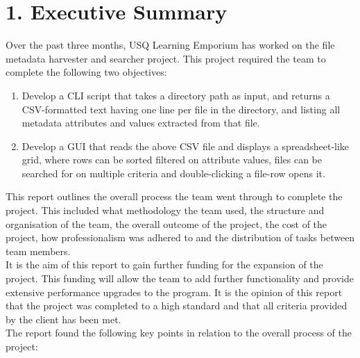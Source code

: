 \documentclass[11pt]{article}
\begin{document}
\newpage





\tableofcontents
\newpage






\setcounter{secnumdepth}{0}

\section{1. Executive Summary}
Over the past three months, USQ Learning Emporium has worked on the file metadata harvester and searcher project. This project required the team to complete the following two objectives:

\begin{enumerate}
\item Develop a CLI script that takes a directory path as input, and returns a CSV-formatted text having one line per file in the directory, and listing all metadata attributes and values extracted from that file.
\item Develop a GUI that reads the above CSV file and displays a spreadsheet-like grid, where rows can be sorted filtered on attribute values, files can be searched for on multiple criteria and double-clicking a file-row opens it.
\end{enumerate}

This report outlines the overall process the team went through to complete the project. This included what methodology the team used, the structure and organisation of the team, the overall outcome of the project, the cost of the project, how professionalism was adhered to and the distribution of tasks between team members. \\

It is the aim of this report to gain further funding for the expansion of the project. This funding will allow the team to add further functionality and provide extensive performance upgrades to the program. It is the opinion of this report that the project was completed to a high standard and that all criteria provided by the client has been met. \\

The report found the following key points in relation to the overall process of the project: 
\end{document}
